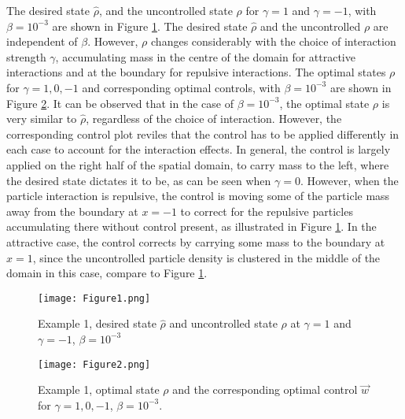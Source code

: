  The desired state $\widehat \rho$, and the uncontrolled state $\rho$ for $\gamma =1$ and $\gamma = -1$, with $\beta =10^{-3}$ are shown in Figure \ref{Ex12DN1}. The desired state $\widehat \rho$ and the uncontrolled $\rho$ are independent of $\beta$. However, $\rho$ changes considerably with the choice of interaction strength $\gamma$, accumulating mass in the centre of the domain for attractive interactions and at the boundary for repulsive interactions. The optimal states $\rho$ for $\gamma = 1,0,-1$ and corresponding optimal controls, with $\beta = 10^{-3}$ are shown in Figure \ref{Ex12DN2}. 
It can be observed that in the case of $\beta = 10^{-3}$, the optimal state $\rho$ is very similar to $\hat \rho$, regardless of the choice of interaction. However, the corresponding control plot reviles that the control has to be applied differently in each case to account for the interaction effects. In general, the control is largely applied on the right half of the spatial domain, to carry mass to the left, where the desired state dictates it to be, as can be seen when $\gamma = 0$. However, when the particle interaction is repulsive, the control is moving some of the particle mass away from the boundary at $x=-1$ to correct for the repulsive particles accumulating there without control present, as illustrated in Figure \ref{Ex12DN1}. In the attractive case, the control corrects by carrying some mass to the boundary at $x=1$, since the uncontrolled particle density is clustered in the middle of the domain in this case, compare to Figure \ref{Ex12DN1}.
\begin{figure}[h]
	\texttt{[image: Figure1.png]}
	\caption{Example 1, desired state $\widehat \rho$ and uncontrolled state $\rho$ at $\gamma =1$ and $\gamma =-1$, $\beta = 10^{-3}$}
	\label{Ex12DN1}
\end{figure}
\begin{figure}[h]
	\texttt{[image: Figure2.png]}
	\caption{Example 1, optimal state $\rho$ and the corresponding optimal control $\vec{w}$ for $\gamma = 1,0,-1$, $\beta = 10^{-3}$.}
	\label{Ex12DN2}
\end{figure}


